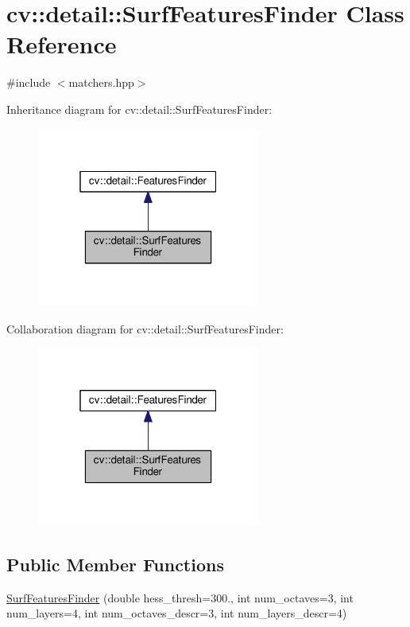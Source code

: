 \hypertarget{classcv_1_1detail_1_1SurfFeaturesFinder}{\section{cv\-:\-:detail\-:\-:Surf\-Features\-Finder Class Reference}
\label{classcv_1_1detail_1_1SurfFeaturesFinder}
}


{\ttfamily \#include $<$matchers.\-hpp$>$}



Inheritance diagram for cv\-:\-:detail\-:\-:Surf\-Features\-Finder\-:\nopagebreak
\begin{figure}[H]
\begin{center}
\leavevmode
\includegraphics[width=208pt]{classcv_1_1detail_1_1SurfFeaturesFinder__inherit__graph}
\end{center}
\end{figure}


Collaboration diagram for cv\-:\-:detail\-:\-:Surf\-Features\-Finder\-:\nopagebreak
\begin{figure}[H]
\begin{center}
\leavevmode
\includegraphics[width=208pt]{classcv_1_1detail_1_1SurfFeaturesFinder__coll__graph}
\end{center}
\end{figure}
\subsection*{Public Member Functions}
\begin{DoxyCompactItemize}
\item 
\hyperlink{classcv_1_1detail_1_1SurfFeaturesFinder_aba81fee5bfab95b58773d05ab3921015}{Surf\-Features\-Finder} (double hess\-\_\-thresh=300., int num\-\_\-octaves=3, int num\-\_\-layers=4, int num\-\_\-octaves\-\_\-descr=3, int num\-\_\-layers\-\_\-descr=4)
\end{DoxyCompactItemize}
